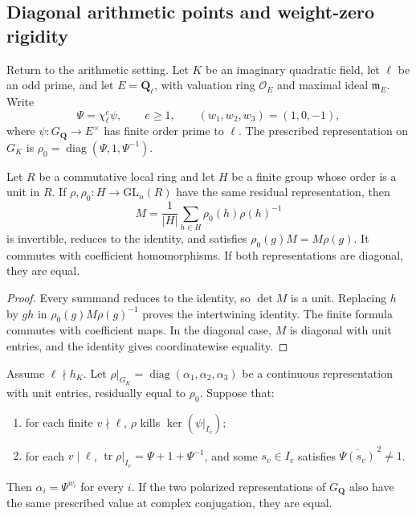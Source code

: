 \subsection{Diagonal arithmetic points and weight-zero rigidity}
\label{subsec:selmer-diagonal-rigidity}

Return to the arithmetic setting. Let $K$ be an imaginary quadratic
field, let $\ell$ be an odd prime, and let
$E=\overline{\mathbf Q}_\ell$, with valuation ring $\mathcal O_E$
and maximal ideal $\mathfrak m_E$. Write
\[
 \Psi=\chi_\ell^e\psi,\qquad e\ge1,\qquad
 (w_1,w_2,w_3)=(1,0,-1),
\]
where $\psi:G_{\mathbf Q}\to E^\times$ has finite order prime to
$\ell$. The prescribed representation on $G_K$ is
$\rho_0=\operatorname{diag}(\Psi,1,\Psi^{-1})$.

\begin{lemma}
\label{lem:selmer-inertia-averaging}
Let $R$ be a commutative local ring and let $H$ be a finite group
whose order is a unit in $R$. If
$\rho,\rho_0:H\to\mathrm{GL}_n(R)$ have the same residual
representation, then
\[
 M=\frac1{|H|}\sum_{h\in H}\rho_0(h)\rho(h)^{-1}
\]
is invertible, reduces to the identity, and satisfies
$\rho_0(g)M=M\rho(g)$. It commutes with coefficient homomorphisms.
If both representations are diagonal, they are equal.
\end{lemma}

\begin{proof}
Every summand reduces to the identity, so $\det M$ is a unit.
Replacing $h$ by $gh$ in
$\rho_0(g)M\rho(g)^{-1}$ proves the intertwining identity.
The finite formula commutes with coefficient maps. In the diagonal
case, $M$ is diagonal with unit entries, and the identity gives
coordinatewise equality.
\end{proof}

\begin{proposition}
\label{prop:selmer-diagonal-point}
Assume $\ell\nmid h_K$. Let
$\rho|_{G_K}=\operatorname{diag}(\alpha_1,\alpha_2,\alpha_3)$
be a continuous representation with unit entries, residually equal
to $\rho_0$. Suppose that:
\begin{enumerate}
\item for each finite $v\nmid\ell$, $\rho$ kills
      $\ker(\psi|_{I_v})$;
\item for each $v\mid\ell$,
      $\operatorname{tr}\rho|_{I_v}=\Psi+1+\Psi^{-1}$, and
      some $s_v\in I_v$ satisfies
      $\overline{\Psi(s_v)}^{\,2}\ne1$.
\end{enumerate}
Then $\alpha_i=\Psi^{w_i}$ for every $i$.
If the two polarized representations of $G_{\mathbf Q}$ also
have the same prescribed value at complex conjugation, they are equal.
\end{proposition}


